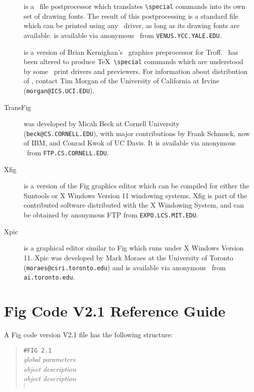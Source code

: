 \begin{description}
\item[\textyl]
	is a \DVI\ file postprocessor which translates {\verb|\special|}
commands into its own set of drawing fonts.
	The result of this postprocessing is a standard \DVI file which
can be printed using any \DVI\ driver, as long as its drawing fonts
	are available.
\textyl is available via anonymous \FTP\ from {\tt VENUS.YCC.YALE.EDU}.

\item[\tpic]
	is a version of Brian Kernighan's \PIC\ graphics preprocessor
	for Troff.
\tpic\ has been altered to produce \TeX\ {\verb|\special|} commands which
	are understood by some \DVI\ print drivers and previewers.
For information about distribution of \tpic, contact Tim Morgan of
	the University of California at Irvine ({\tt morgan@ICS.UCI.EDU}).

\item[TransFig]
	was developed by Micah Beck at Cornell University
	\linebreak ({\tt beck@CS.CORNELL.EDU}), with major contributions
	by Frank Schmuck, now of IBM, and Conrad Kwok of UC Davis.
	It is available via anonymous \FTP\ from {\tt FTP.CS.CORNELL.EDU}.

\item[Xfig]
	is a version of the Fig graphics editor which can be compiled for
	either the Suntools or X Windows Version 11 windowing systems.
Xfig is part of the contributed software distributed with the X Windowing
	System, and can be obtained by anonymous FTP from 
	{\tt EXPO.LCS.MIT.EDU}.

\item[Xpic]
	is a graphical editor similar to Fig which runs under X Windows
	Version 11.
Xpic was developed by Mark Moraes at the University of Toronto
	({\tt moraes@csri.toronto.edu}) and is available via anonymous
	\FTP\ from {\tt ai.toronto.edu}.

\end{description}

\raggedbottom
\pagebreak

\appendix

\section{Fig Code V2.1 Reference Guide}
\label{s:guide}
A Fig code version V2.1 file has the following structure:
%
\begin{quote}
\begin{tabbing}
\verb|#FIG 2.1|			\\
\it global parameters	  	\\
\it object description	 	\\
\it object \= \it description 	\\
\> $\vdots$
\end{tabbing}
\end{quote}
%
